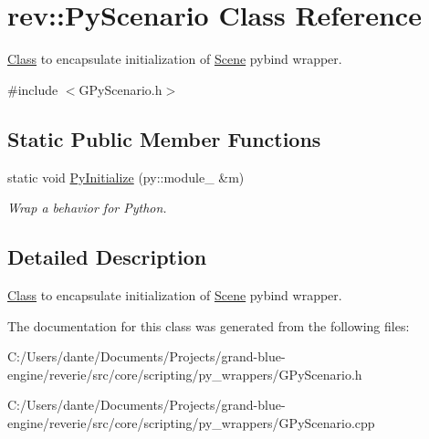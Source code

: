 \hypertarget{classrev_1_1_py_scenario}{}\section{rev\+::Py\+Scenario Class Reference}
\label{classrev_1_1_py_scenario}


\mbox{\hyperlink{struct_class}{Class}} to encapsulate initialization of \mbox{\hyperlink{classrev_1_1_scene}{Scene}} pybind wrapper.  




{\ttfamily \#include $<$G\+Py\+Scenario.\+h$>$}

\subsection*{Static Public Member Functions}
\begin{DoxyCompactItemize}
\item 
\mbox{\label{classrev_1_1_py_scenario_aca99314d82b0c87fb29719f45d46157e}} 
static void \mbox{\hyperlink{classrev_1_1_py_scenario_aca99314d82b0c87fb29719f45d46157e}{Py\+Initialize}} (py\+::module\+\_\+ \&m)
\begin{DoxyCompactList}\small\item\em Wrap a behavior for Python. \end{DoxyCompactList}\end{DoxyCompactItemize}


\subsection{Detailed Description}
\mbox{\hyperlink{struct_class}{Class}} to encapsulate initialization of \mbox{\hyperlink{classrev_1_1_scene}{Scene}} pybind wrapper. 

The documentation for this class was generated from the following files\+:\begin{DoxyCompactItemize}
\item 
C\+:/\+Users/dante/\+Documents/\+Projects/grand-\/blue-\/engine/reverie/src/core/scripting/py\+\_\+wrappers/G\+Py\+Scenario.\+h\item 
C\+:/\+Users/dante/\+Documents/\+Projects/grand-\/blue-\/engine/reverie/src/core/scripting/py\+\_\+wrappers/G\+Py\+Scenario.\+cpp\end{DoxyCompactItemize}
